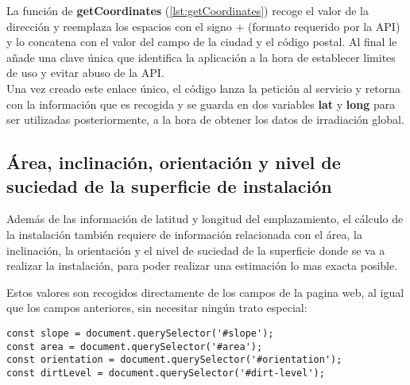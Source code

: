 La función de \textbf{getCoordinates} (\ref{lst:getCoordinates}) recoge el valor de la dirección y reemplaza los espacios con el signo + (formato requerido por la API) y lo concatena con el valor del campo de la ciudad y el código postal. Al final le añade una clave única que identifica la aplicación a la hora de establecer limites de uso y evitar abuso de la API.\\

Una vez creado este enlace único, el código lanza la petición al servicio y retorna con la información que es recogida y se guarda en dos variables \textbf{lat} y \textbf{long} para ser utilizadas posteriormente, a la hora de obtener los datos de irradiación global.

\subsection{Área, inclinación, orientación y nivel de suciedad de la superficie de instalación}

Además de las información de latitud y longitud del emplazamiento, el cálculo de la instalación también requiere de información relacionada con el área, la inclinación, la orientación y el nivel de suciedad de la superficie donde se va a realizar la instalación, para poder realizar una estimación lo mas exacta posible.

Estos valores son recogidos directamente de los campos de la pagina web, al igual que los campos anteriores, sin necesitar ningún trato especial:
\begin{lstlisting}[style=ES6, caption={Variables correspondientes a los campos indicados}]
const slope = document.querySelector('#slope');
const area = document.querySelector('#area');
const orientation = document.querySelector('#orientation');
const dirtLevel = document.querySelector('#dirt-level');
\end{lstlisting}